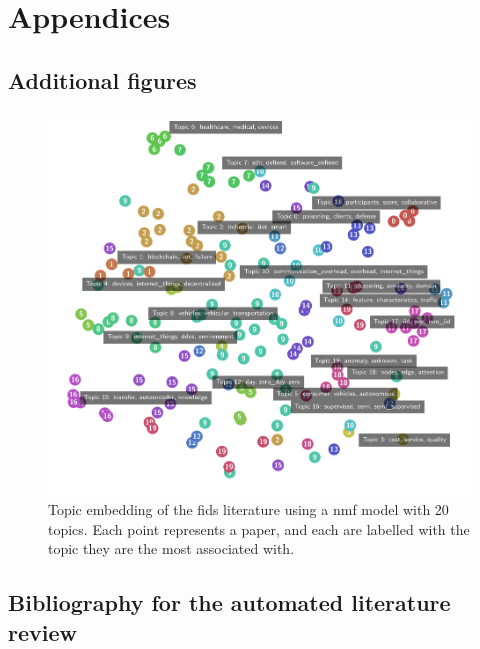 \chapter*{Appendices\label{part:appendices}}

\renewcommand{\thesection}{\Alph{section}}
\section{Additional figures\label{sec:append.figures}}


\begin{figure}[H]
  \centering
  \includegraphics[width=\textwidth]{figures/topic_embedding.pdf}
  \caption{
    Topic embedding of the \gls{fids} literature using a \gls{nmf} model with 20 topics.
    Each point represents a paper, and each are labelled with the topic they are the most associated with.
    \label{fig:append.figure1}
  }
\end{figure}

\newpage
\section{Bibliography for the automated literature review\label{sec:append.biblio}}

{\small
}

\newpage


\newpage

